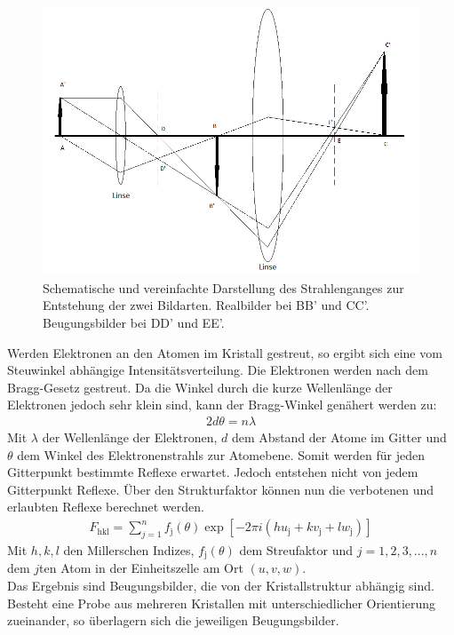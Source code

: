 \documentclass[a4paper,11pt,DIV=11]{scrartcl}
\begin{document}
\begin{figure}[H]
\center
\includegraphics[width=\textwidth]{Strahlengang.png}
\caption{Schematische und vereinfachte Darstellung des Strahlenganges zur Entstehung der zwei Bildarten. Realbilder bei BB' und CC'. Beugungsbilder bei DD' und EE'.}
\label{Strahlengang}
\end{figure}
Werden Elektronen an den Atomen im Kristall gestreut, so ergibt sich eine vom Steuwinkel abhängige Intensitätsverteilung. Die Elektronen werden nach dem Bragg-Gesetz gestreut. Da die Winkel durch die kurze Wellenlänge der Elektronen jedoch sehr klein sind, kann der Bragg-Winkel genähert werden zu:
\begin{align}
2d\theta = n\lambda
\end{align}
Mit \(\lambda\) der Wellenlänge der Elektronen, \(d\) dem Abstand der Atome im Gitter und \(\theta\) dem Winkel des Elektronenstrahls zur Atomebene. Somit werden für jeden Gitterpunkt bestimmte Reflexe erwartet. Jedoch entstehen nicht von jedem Gitterpunkt Reflexe. Über den Strukturfaktor können nun die verbotenen und erlaubten Reflexe berechnet werden.
\begin{align}
F_\mathrm{hkl}= \sum_{j=1}^n f_\mathrm{j}(\theta)\exp[-2\pi i (hu_\mathrm{j}+kv_\mathrm{j}+lw_\mathrm{j})]
\end{align}
Mit \(h,k,l\) den Millerschen Indizes, \(f_\mathrm{j}(\theta)\) dem Streufaktor und \(j=1,2,3,...,n\) dem \(j\)ten Atom in der Einheitszelle am Ort \((u,v,w)\).\\
Das Ergebnis sind Beugungsbilder, die von der Kristallstruktur abhängig sind. Besteht eine Probe aus mehreren Kristallen mit unterschiedlicher Orientierung zueinander, so überlagern sich die jeweiligen Beugungsbilder.
\end{document}
